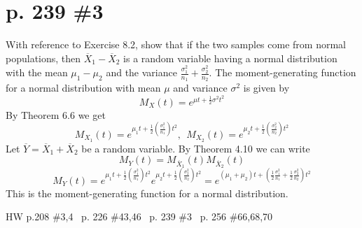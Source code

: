 \documentclass[12pt]{article}
\begin{document}
	\section[20pt]{p. 239 \#3}
	With reference to Exercise 8.2, show that if the two samples come from normal populations, then \(\overline{X}_1-\overline{X}_2\) is a random variable having a normal distribution with the mean \(\mu_1-\mu_2\) and the variance \(\frac{\sigma^2_1}{n_1}+\frac{\sigma^2_2}{n_2}\).
	\newline \newline
	The moment-generating function for a normal distribution with mean \(\mu\) and variance \(\sigma^2\) is given by
	\[M_X(t)=e^{\mu t + \frac{1}{2}\sigma^2t^2}\]
	By Theorem 6.6 we get
	\[M_{X_1}(t)=e^{\mu_1 t + \frac{1}{2}\left(\frac{\sigma_1^2}{n_1}\right)t^2},\ \ M_{X_2}(t)=e^{\mu_2 t + \frac{1}{2}\left(\frac{\sigma_2^2}{n_2}\right)t^2}\]
	Let \(\overline{Y}=\overline{X}_1+\overline{X}_2\) be a random variable.
	By Theorem 4.10 we can write
	\[M_Y(t)=M_{\overline{X}_1}(t)M_{\overline{X}_2}(t)\]
	\[M_Y(t)=e^{\mu_1 t + \frac{1}{2}\left(\frac{\sigma_1^2}{n_1}\right)t^2}e^{\mu_2 t + \frac{1}{2}\left(\frac{\sigma_2^2}{n_2}\right)t^2}=e^{(\mu_1+\mu_2)t+\left(\frac{1}{2}\frac{\sigma_1^2}{n_1}+\frac{1}{2}\frac{\sigma_2^2}{n_2}\right)t^2}\]
	This is the moment-generating function for a normal distribution. \newline \newline
	\newpage
	\maketitle HW p.208 \#3,4 \ p. 226 \#43,46 \ p. 239 \#3 \ p. 256 \#66,68,70
\end{document}
